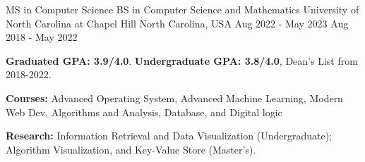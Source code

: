 

\begin{cventries}
\cvedentry
    {MS in Computer Science } %
    {BS in Computer Science and Mathematics}
    {University of North Carolina at Chapel Hill} %
    {North Carolina, USA} %
    {Aug 2022 - May 2023}
    {Aug 2018 - May 2022} %
    {
      \begin{cvitems} %
        \item {\textbf{Graduated GPA: 3.9/4.0}. \textbf{Undergraduate GPA: 3.8/4.0}, Dean's List from 2018-2022. }
        \item {\textbf{Courses:} Advanced Operating System, Advanced Machine Learning, Modern Web Dev, Algorithms and Analysis, Database, and Digital logic}
        \item {\textbf{Research:}  Information Retrieval and Data Visualization (Undergraduate); Algorithm Visualization, and Key-Value Store (Master's).}
      \end{cvitems}
    }

\end{cventries}
